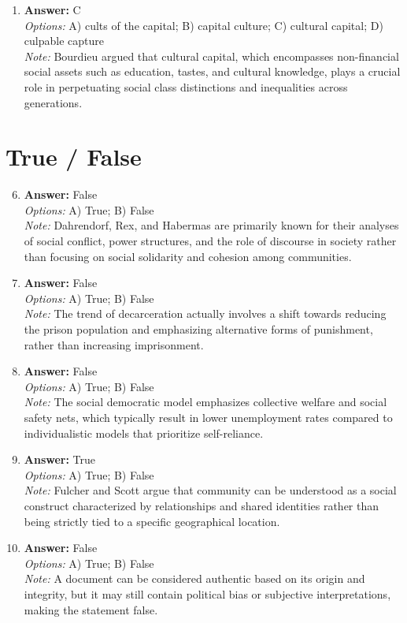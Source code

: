\documentclass[12pt]{article}
\begin{document}
\begin{enumerate}[label=\arabic*.]
\\ \textit{Note:} This answer is correct because Durkheim emphasized that social facts are phenomena that exist outside the individual and exert control over social behavior, highlighting their collective nature and social origins.
\item \textbf{Answer:} C
\\ \textit{Options:} A) cults of the capital; B) capital culture; C) cultural capital; D) culpable capture
\\ \textit{Note:} Bourdieu argued that cultural capital, which encompasses non-financial social assets such as education, tastes, and cultural knowledge, plays a crucial role in perpetuating social class distinctions and inequalities across generations.
\end{enumerate}

\section*{True / False}
\begin{enumerate}[label=\arabic*.]
\setcounter{enumi}{5}
\item \textbf{Answer:} False
\\ \textit{Options:} A) True; B) False
\\ \textit{Note:} Dahrendorf, Rex, and Habermas are primarily known for their analyses of social conflict, power structures, and the role of discourse in society rather than focusing on social solidarity and cohesion among communities.
\item \textbf{Answer:} False
\\ \textit{Options:} A) True; B) False
\\ \textit{Note:} The trend of decarceration actually involves a shift towards reducing the prison population and emphasizing alternative forms of punishment, rather than increasing imprisonment.
\item \textbf{Answer:} False
\\ \textit{Options:} A) True; B) False
\\ \textit{Note:} The social democratic model emphasizes collective welfare and social safety nets, which typically result in lower unemployment rates compared to individualistic models that prioritize self-reliance.
\item \textbf{Answer:} True
\\ \textit{Options:} A) True; B) False
\\ \textit{Note:} Fulcher and Scott argue that community can be understood as a social construct characterized by relationships and shared identities rather than being strictly tied to a specific geographical location.
\item \textbf{Answer:} False
\\ \textit{Options:} A) True; B) False
\\ \textit{Note:} A document can be considered authentic based on its origin and integrity, but it may still contain political bias or subjective interpretations, making the statement false.
\end{enumerate}
\end{document}
